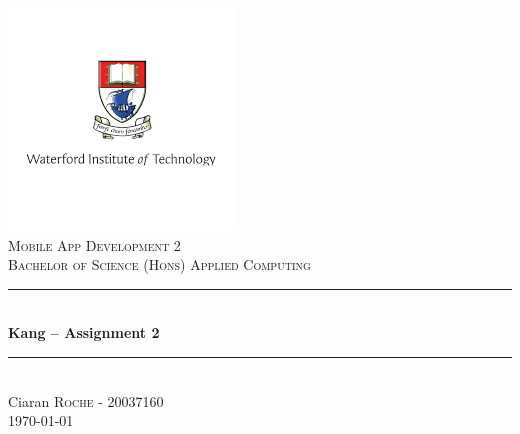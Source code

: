 \begin{titlepage}

\newcommand{\HRule}{\rule{\linewidth}{0.5mm}}

\center

\includegraphics{images/logo.png}\\
\textsc{\Large Mobile App Development 2}\\[0.5cm]
\textsc{\large Bachelor of Science (Hons) Applied Computing }\\[0.5cm] 


\HRule \\[0.4cm]
{ \huge \bfseries Kang -- Assignment 2}\\[0.4cm] 
\HRule \\[1.5cm]

\Large Ciaran \textsc{Roche} - 20037160\\[3cm]


{\large \today}\\[1cm]

\vfill 

\end{titlepage}
